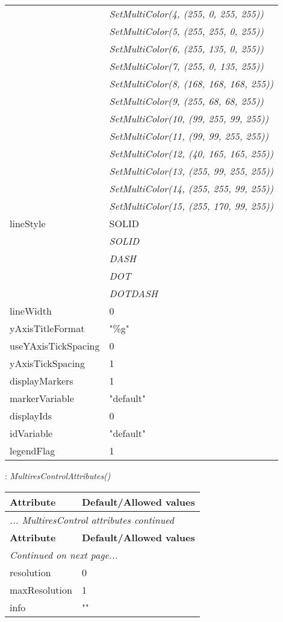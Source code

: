 \documentclass[10pt,a4paper]{report}
\begin{document}
\begin{longtable}{lp{7.5cm}}
 & {\it  SetMultiColor(4, (255, 0, 255, 255))} \\
 & {\it  SetMultiColor(5, (255, 255, 0, 255))} \\
 & {\it  SetMultiColor(6, (255, 135, 0, 255))} \\
 & {\it  SetMultiColor(7, (255, 0, 135, 255))} \\
 & {\it  SetMultiColor(8, (168, 168, 168, 255))} \\
 & {\it  SetMultiColor(9, (255, 68, 68, 255))} \\
 & {\it  SetMultiColor(10, (99, 255, 99, 255))} \\
 & {\it  SetMultiColor(11, (99, 99, 255, 255))} \\
 & {\it  SetMultiColor(12, (40, 165, 165, 255))} \\
 & {\it  SetMultiColor(13, (255, 99, 255, 255))} \\
 & {\it  SetMultiColor(14, (255, 255, 99, 255))} \\
 & {\it  SetMultiColor(15, (255, 170, 99, 255))} \\
lineStyle  &  SOLID   \\
 & {\it  SOLID} \\
 & {\it  DASH} \\
 & {\it  DOT} \\
 & {\it  DOTDASH} \\
lineWidth  &  0 \\
yAxisTitleFormat  &  "\%g" \\
useYAxisTickSpacing  &  0 \\
yAxisTickSpacing  &  1 \\
displayMarkers  &  1 \\
markerVariable  &  "default" \\
displayIds  &  0 \\
idVariable  &  "default" \\
legendFlag  &  1 \\
\end{longtable}

\newpage

{}
: {\it MultiresControlAttributes() }\\[-3mm]

\begin{longtable}{ll}
{\bf Attribute} & {\bf Default/Allowed values} \\
\hline \hline
\endfirsthead
\multicolumn{2}{l}{{\it ... MultiresControl attributes continued}} \\
{\bf Attribute} & {\bf Default/Allowed values} \\
\hline \hline
\endhead
\hline
\multicolumn{2}{l}{{\it Continued on next page...}} \\
\endfoot
\hline
\endlastfoot

resolution  &  0 \\
maxResolution  &  1 \\
info  &  "" \\
\end{longtable}
\end{document}
